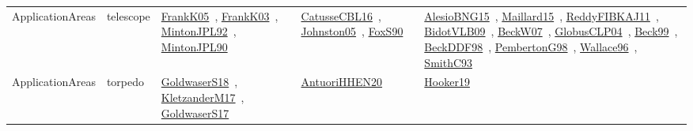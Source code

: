 {\begin{longtable}{lp{3cm}>{\raggedright\arraybackslash}p{6cm}>{\raggedright\arraybackslash}p{6cm}>{\raggedright\arraybackslash}p{8cm}}
\index{telescope}\index{ApplicationAreas!telescope}ApplicationAreas & telescope & \href{../works/FrankK05.pdf}{FrankK05}~\cite{FrankK05}, \href{../works/FrankK03.pdf}{FrankK03}~\cite{FrankK03}, \href{../works/MintonJPL92.pdf}{MintonJPL92}~\cite{MintonJPL92}, \href{../works/MintonJPL90.pdf}{MintonJPL90}~\cite{MintonJPL90} & \href{../works/CatusseCBL16.pdf}{CatusseCBL16}~\cite{CatusseCBL16}, \href{../works/Johnston05.pdf}{Johnston05}~\cite{Johnston05}, \href{../works/FoxS90.pdf}{FoxS90}~\cite{FoxS90} & \href{../works/AlesioBNG15.pdf}{AlesioBNG15}~\cite{AlesioBNG15}, \href{../works/Maillard15.pdf}{Maillard15}~\cite{Maillard15}, \href{../works/ReddyFIBKAJ11.pdf}{ReddyFIBKAJ11}~\cite{ReddyFIBKAJ11}, \href{../works/BidotVLB09.pdf}{BidotVLB09}~\cite{BidotVLB09}, \href{../works/BeckW07.pdf}{BeckW07}~\cite{BeckW07}, \href{../works/GlobusCLP04.pdf}{GlobusCLP04}~\cite{GlobusCLP04}, \href{../works/Beck99.pdf}{Beck99}~\cite{Beck99}, \href{../works/BeckDDF98.pdf}{BeckDDF98}~\cite{BeckDDF98}, \href{../works/PembertonG98.pdf}{PembertonG98}~\cite{PembertonG98}, \href{../works/Wallace96.pdf}{Wallace96}~\cite{Wallace96}, \href{../works/SmithC93.pdf}{SmithC93}~\cite{SmithC93}\\
\index{torpedo}\index{ApplicationAreas!torpedo}ApplicationAreas & torpedo & \href{../works/GoldwaserS18.pdf}{GoldwaserS18}~\cite{GoldwaserS18}, \href{../works/KletzanderM17.pdf}{KletzanderM17}~\cite{KletzanderM17}, \href{../works/GoldwaserS17.pdf}{GoldwaserS17}~\cite{GoldwaserS17} & \href{../works/AntuoriHHEN20.pdf}{AntuoriHHEN20}~\cite{AntuoriHHEN20} & \href{../works/Hooker19.pdf}{Hooker19}~\cite{Hooker19}\\

\end{longtable}}
